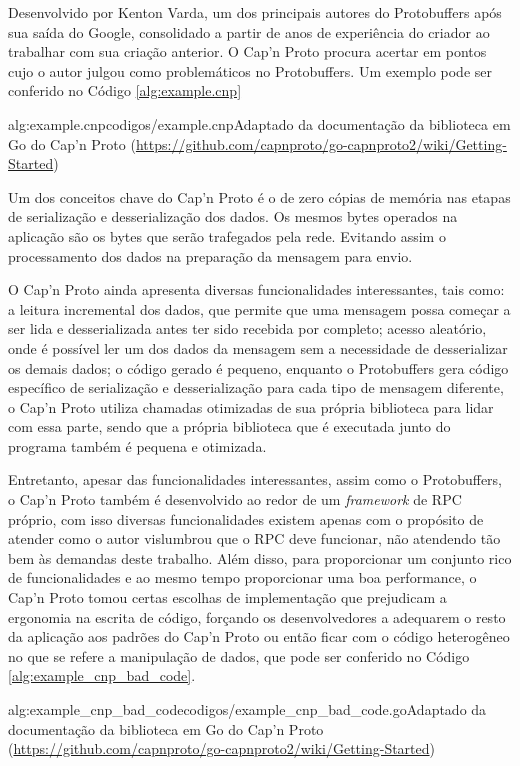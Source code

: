 Desenvolvido por Kenton Varda, um dos principais autores do Protobuffers após sua saída do Google, consolidado a partir de anos de experiência do criador ao trabalhar com sua criação anterior. O Cap'n Proto procura acertar em pontos cujo o autor julgou como problemáticos no Protobuffers. Um exemplo pode ser conferido no Código \ref{alg:example.cnp}

 {alg:example.cnp}{codigos/example.cnp}{Adaptado da documentação da biblioteca em Go do Cap'n Proto (\url{https://github.com/capnproto/go-capnproto2/wiki/Getting-Started})}

Um dos conceitos chave do Cap'n Proto é o de zero cópias de memória nas etapas de serialização e desserialização dos dados. Os mesmos bytes operados na aplicação são os bytes que serão trafegados pela rede. Evitando assim o processamento dos dados na preparação da mensagem para envio.

O Cap'n Proto ainda apresenta diversas funcionalidades interessantes, tais como: a leitura incremental dos dados, que permite que uma mensagem possa começar a ser lida e desserializada antes ter sido recebida por completo; acesso aleatório, onde é possível ler um dos dados da mensagem sem a necessidade de desserializar os demais dados; o código gerado é pequeno, enquanto o Protobuffers gera código específico de serialização e desserialização para cada tipo de mensagem diferente, o Cap'n Proto utiliza chamadas otimizadas de sua própria biblioteca para lidar com essa parte, sendo que a própria biblioteca que é executada junto do programa também é pequena e otimizada.

Entretanto, apesar das funcionalidades interessantes, assim como o Protobuffers, o Cap'n Proto também é desenvolvido ao redor de um \textit{framework} de RPC próprio, com isso diversas funcionalidades existem apenas com o propósito de atender como o autor vislumbrou que o RPC deve funcionar, não atendendo tão bem às demandas deste trabalho. Além disso, para proporcionar um conjunto rico de funcionalidades e ao mesmo tempo proporcionar uma boa performance, o Cap'n Proto tomou certas escolhas de implementação que prejudicam a ergonomia na escrita de código, forçando os desenvolvedores a adequarem o resto da aplicação aos padrões do Cap'n Proto ou então ficar com o código heterogêneo no que se refere a manipulação de dados, que pode ser conferido no Código \ref{alg:example_cnp_bad_code}.

 {alg:example_cnp_bad_code}{codigos/example_cnp_bad_code.go}{Adaptado da documentação da biblioteca em Go do Cap'n Proto (\url{https://github.com/capnproto/go-capnproto2/wiki/Getting-Started})}

